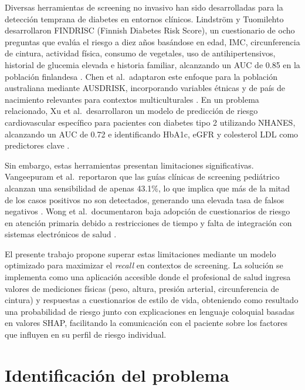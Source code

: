 \documentclass[12pt, a4paper]{report}
\begin{document}
Diversas herramientas de screening no invasivo han sido desarrolladas para la detección temprana de diabetes en entornos clínicos. Lindström y Tuomilehto desarrollaron FINDRISC (Finnish Diabetes Risk Score), un cuestionario de ocho preguntas que evalúa el riesgo a diez años basándose en edad, IMC, circunferencia de cintura, actividad física, consumo de vegetales, uso de antihipertensivos, historial de glucemia elevada e historia familiar, alcanzando un AUC de 0.85 en la población finlandesa \citep{lindstrom2003findrisc}. Chen et al.\ adaptaron este enfoque para la población australiana mediante AUSDRISK, incorporando variables étnicas y de país de nacimiento relevantes para contextos multiculturales \citep{chen2010ausdrisk}. En un problema relacionado, Xu et al.\ desarrollaron un modelo de predicción de riesgo cardiovascular específico para pacientes con diabetes tipo 2 utilizando NHANES, alcanzando un AUC de 0.72 e identificando HbA1c, eGFR y colesterol LDL como predictores clave \citep{xu2024development}.

Sin embargo, estas herramientas presentan limitaciones significativas. Vangeepuram et al.\ reportaron que las guías clínicas de screening pediátrico alcanzan una sensibilidad de apenas 43.1\%, lo que implica que más de la mitad de los casos positivos no son detectados, generando una elevada tasa de falsos negativos \citep{vangeepuram2021predicting}. Wong et al.\ documentaron baja adopción de cuestionarios de riesgo en atención primaria debido a restricciones de tiempo y falta de integración con sistemas electrónicos de salud \citep{wong2011ausdrisk}.

El presente trabajo propone superar estas limitaciones mediante un modelo optimizado para maximizar el \textit{recall} en contextos de screening. La solución se implementa como una aplicación accesible donde el profesional de salud ingresa valores de mediciones físicas (peso, altura, presión arterial, circunferencia de cintura) y respuestas a cuestionarios de estilo de vida, obteniendo como resultado una probabilidad de riesgo junto con explicaciones en lenguaje coloquial basadas en valores SHAP, facilitando la comunicación con el paciente sobre los factores que influyen en su perfil de riesgo individual.

\section{Identificación del problema}
\end{document}
